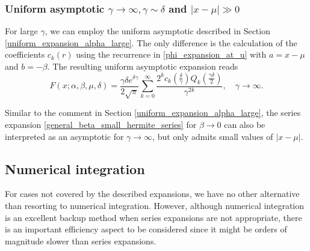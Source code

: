 \documentclass[10pt,a4paper,oneside]{article}
\numberwithin{equation}{section}
\begin{document}
\subsubsection{Uniform asymptotic $\gamma \to \infty, \gamma \sim \delta$ and $|x-\mu| \gg 0$}
For large $\gamma$, we can employ the uniform asymptotic described in Section \ref{uniform_expansion_alpha_large}. The only difference is the calculation of the coefficients $c_k(r)$ using the recurrence in \eqref{phi_expansion_at_u} with $a = x-\mu$ and $b = -\beta$. The resulting uniform asymptotic expansion reads
\begin{equation}
F(x; \alpha, \beta, \mu, \delta) = \frac{\gamma \delta e^{\delta \gamma}}{2\sqrt{\pi}} \sum_{k=0}^{\infty} \frac{2^k c_k\left(\frac{\delta}{\gamma}\right) Q_k\left(\frac{\gamma\delta}{2}\right)}{\gamma^{2k}}, \quad \gamma \to \infty.
\end{equation}

Similar to the comment in Section \ref{uniform_expansion_alpha_large}, the series expansion \eqref{general_beta_small_hermite_series} for $\beta \to 0$ can also be interpreted as an asymptotic for $\gamma \to \infty$, but only admits small values of $|x-\mu|$.

\subsection{Numerical integration}\label{section_numerical_integration}

For cases not covered by the described expansions, we have no other alternative than resorting to numerical integration. However, although numerical integration is an excellent backup method when series expansions are not appropriate, there is an important efficiency aspect to be considered since it might be orders of magnitude slower than series expansions. 
\end{document}
